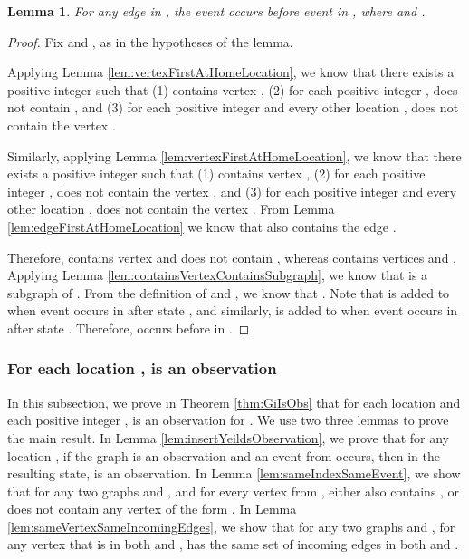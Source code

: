 \documentclass[11pt]{article}
\numberwithin{theorem}{section}
\newtheorem{lemma}[theorem]{Lemma}
\begin{document}
\begin{lemma}
\label{lem:edgeHappensBefore}
For any edge  in , the event  occurs
before event  in , where  and .
\end{lemma}

\begin{proof}
Fix  and , as in the hypotheses of the lemma.

Applying Lemma \ref{lem:vertexFirstAtHomeLocation}, we know that there
exists a positive integer  such that (1) 
contains vertex , (2) for each positive integer ,
 does not contain , and (3) for each
positive integer  and every other location ,
 does not contain the vertex .

Similarly, applying Lemma \ref{lem:vertexFirstAtHomeLocation}, we know
that there exists a positive integer  such that (1)
 contains vertex , (2) for each positive
integer ,  does not contain the
vertex , and (3) for each positive integer  and
every other location ,  does not contain the
vertex . From Lemma \ref{lem:edgeFirstAtHomeLocation} we know
that  also contains the edge .

Therefore,  contains vertex  and does not
contain , whereas  contains vertices 
and . Applying Lemma \ref{lem:containsVertexContainsSubgraph}, we
know that   is a subgraph of
. From the definition of  and , we
know that . Note that  is added to
 when event  occurs in  after
state , and similarly,  is added to
 when event  occurs in  after
state . Therefore,  occurs before  in
.
\end{proof}










\subsubsection{For each location ,  is an observation}
\label{subsubsec:proofGisAreObs}

In this subsection, we prove in Theorem \ref{thm:GiIsObs} that for each location  and each positive
integer ,  is an observation for . We use two three lemmas to prove the main result. In Lemma \ref{lem:insertYeildsObservation}, we prove that for any location , if the graph  is an observation and an event from  occurs, then in the resulting state,  is an observation. In Lemma \ref{lem:sameIndexSameEvent}, we show that for any two graphs  and , and for every vertex  from , either  also contains , or  does not contain any vertex of the form . In Lemma \ref{lem:sameVertexSameIncomingEdges}, we show that for any two graphs  and , for any vertex  that is in both  and ,  has the same set of incoming edges in both  and .
\end{document}
